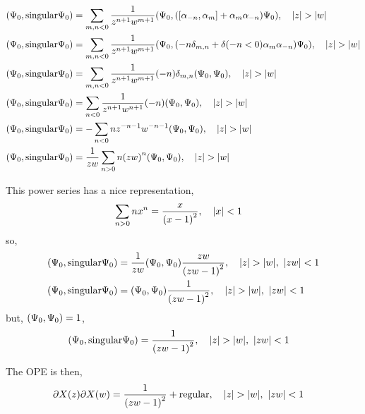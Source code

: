 \begin{align*}
    \qty(\Psi_0,\textnormal{singular}\Psi_0)&=\sum\limits_{m,n<0}\frac{1}{z^{n+1}w^{m+1}}\qty(\Psi_0,\qty(\comm{\alpha_{-n}}{\alpha_m}+\alpha_m\alpha_{-n})\Psi_0),\ \ \ \abs{z}>\abs{w}\\
    \qty(\Psi_0,\textnormal{singular}\Psi_0)&=\sum\limits_{m,n<0}\frac{1}{z^{n+1}w^{m+1}}\qty(\Psi_0,\qty(-n\delta_{m,n}+\delta\qty(-n<0)\alpha_m\alpha_{-n})\Psi_0),\ \ \ \abs{z}>\abs{w}\\
    \qty(\Psi_0,\textnormal{singular}\Psi_0)&=\sum\limits_{m,n<0}\frac{1}{z^{n+1}w^{m+1}}\qty(-n)\delta_{m,n}\qty(\Psi_0,\Psi_0),\ \ \ \abs{z}>\abs{w}\\
    \qty(\Psi_0,\textnormal{singular}\Psi_0)&=\sum\limits_{n<0}\frac{1}{z^{n+1}w^{n+1}}\qty(-n)\qty(\Psi_0,\Psi_0),\ \ \ \abs{z}>\abs{w}\\
    \qty(\Psi_0,\textnormal{singular}\Psi_0)&=-\sum\limits_{n<0}nz^{-n-1}w^{-n-1}\qty(\Psi_0,\Psi_0),\ \ \ \abs{z}>\abs{w}\\
    \qty(\Psi_0,\textnormal{singular}\Psi_0)&=\frac{1}{zw}\sum\limits_{n>0}n\qty(zw)^{n}\qty(\Psi_0,\Psi_0),\ \ \ \abs{z}>\abs{w}
\end{align*}

This power series has a nice representation,
\begin{align*}
    \sum\limits_{n>0}nx^n&=\frac{x}{\qty(x-1)^2},\ \ \ \abs{x}<1
\end{align*}
so,
\begin{align*}
    \qty(\Psi_0,\textnormal{singular}\Psi_0)&=\frac{1}{zw}\qty(\Psi_0,\Psi_0)\frac{zw}{\qty(zw-1)^2},\ \ \ \abs{z}>\abs{w},\ \abs{zw}<1\\
    \qty(\Psi_0,\textnormal{singular}\Psi_0)&=\qty(\Psi_0,\Psi_0)\frac{1}{\qty(zw-1)^2},\ \ \ \abs{z}>\abs{w},\ \abs{zw}<1
\end{align*}
but, $\qty(\Psi_0,\Psi_0)=1$,
\begin{align*}
    \qty(\Psi_0,\textnormal{singular}\Psi_0)&=\frac{1}{\qty(zw-1)^2},\ \ \ \abs{z}>\abs{w},\ \abs{zw}<1
\end{align*}

The OPE is then,
\begin{align*}
    \partial X\qty(z)\partial X\qty(w)&=\frac{1}{\qty(zw-1)^2}+\textnormal{regular},\ \ \ \abs{z}>\abs{w},\ \abs{zw}<1
\end{align*}
